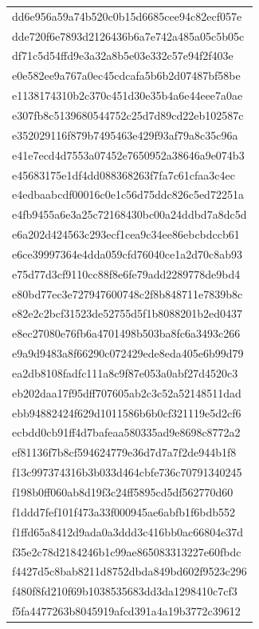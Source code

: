 \begin{tabular}{l}
dd6e956a59a74b520c0b15d6685cee94c82ecf057e \\
dde720f6e7893d2126436b6a7e742a485a05c5b05c \\
df71c5d54ffd9e3a32a8b5e03e332c57e94f2f403e \\
e0e582ee9a767a0ec45cdcafa5b6b2d07487bf58be \\
e1138174310b2c370c451d30e35b4a6e44eee7a0ae \\
e307fb8c5139680544752c25d7d89cd22eb102587c \\
e352029116f879b7495463e429f93af79a8c35c96a \\
e41e7ecd4d7553a07452e7650952a38646a9e074b3 \\
e45683175e1df4dd088368263f7fa7c61cfaa3c4ec \\
e4edbaabcdf00016c0e1c56d75ddc826c5ed72251a \\
e4fb9455a6e3a25c72168430bc00a24ddbd7a8dc5d \\
e6a202d424563c293ecf1cea9c34ee86ebcbdccb61 \\
e6ce39997364e4dda059cfd76040ce1a2d70c8ab93 \\
e75d77d3cf9110cc88f8e6fe79add2289778de9bd4 \\
e80bd77ec3e727947600748c2f8b848711e7839b8c \\
e82e2c2bcf31523de52755d5f1b8088201b2ed0437 \\
e8ec27080e76fb6a4701498b503ba8fc6a3493c266 \\
e9a9d9483a8f66290c072429ede8eda405e6b99d79 \\
ea2db8108fadfc111a8c9f87e053a0abf27d4520c3 \\
eb202daa17f95dff707605ab2c3c52a52148511dad \\
ebb94882424f629d1011586b6b0cf321119e5d2cf6 \\
ecbdd0cb91ff4d7bafeaa580335ad9e8698c8772a2 \\
ef81136f7b8cf594624779e36d7d7a7f2de944b1f8 \\
f13c997374316b3b033d464cbfe736c70791340245 \\
f198b0ff060ab8d19f3c24ff5895cd5df562770d60 \\
f1ddd7fef101f473a33f000945ae6abfb1f6bdb552 \\
f1ffd65a8412d9ada0a3ddd3c416bb0ac66804e37d \\
f35e2c78d2184246b1c99ae865083313227e60fbdc \\
f4427d5c8bab8211d8752dbda849bd602f9523c296 \\
f480f8fd210f69b1038535683dd3da1298410c7cf3 \\
f5fa4477263b8045919afcd391a4a19b3772c39612 \\

\end{tabular}
